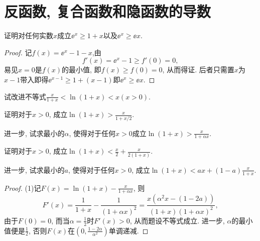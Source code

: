\section{反函数, 复合函数和隐函数的导数}
\begin{quiza}
\woe 证明对任何实数\(x\)成立\(\ee^x\geqslant 1+x\)以及\(\ee^x\geqslant \ee x\).
\begin{proof}
记\(f(x)=\ee^x-1-x\),由\[f'(x)=\ee^x-1\geqslant f'(0)=0,\]易见\(x=0\)是\(f(x)\)的最小值, 即\(f(x)\geqslant f(0)=0\), 从而得证. 后者只需置\(x\)为\(x-1\)带入即得\(\ee^{x-1}\geqslant 1+(x-1)\)即\(\ee^{x}\geqslant\ee x\).
\end{proof}
\woe 试改进不等式\(\frac{x}{1+x}<\ln(1+x)<x(x>0)\).
\begin{quizs}
\item 证明对于\(x>0\), 成立\(\ln (1+x)>\frac{x}{1+x/2}\).

 进一步, 试求最小的\(\alpha\), 使得对于任何\(x>0\)成立\(\ln(1+x)>\frac{x}{1+\alpha x}\).
\item 证明对于\(x>0\), 成立\(\ln (1+x)<\frac{x}{2}+\frac{x}{2(1+x)}\).

进一步, 试求最小的\(a\), 使得对于任何\(x>0\), 成立\(\ln (1+x)<ax+(1-a)\frac{x}{1+x}\).
\end{quizs}
\begin{proof}
(1)记\(F(x)=\ln(1+x)-\frac{x}{1+\alpha x}\), 则\[F'(x)=\frac{1}{1+x}-\frac{1}{(1+\alpha x)^2}=\frac{x(\alpha^2x-(1-2a))}{(1+x)(1+\alpha x)^2},\]
由于\(F(0)=0\), 而当\(\alpha=\frac{1}{2}\)时\(F'(x)>0\), 从而题设不等式成立. 进一步, \(\alpha\)的最小值便是\(\frac{1}{2}\), 否则\(F(x)\)在\(\left(0,\frac{1-2\alpha}{\alpha^2}\right)\)单调递减.


\end{proof}
\end{quiza}
